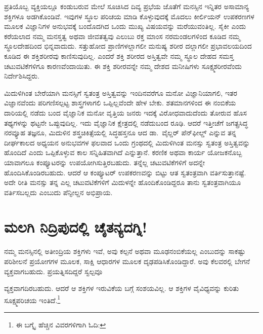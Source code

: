 \newpage

ಪ್ರತಿಯೊಬ್ಬ ವ್ಯಕ್ತಿಯಲ್ಲೂ ಕಂಡುಬರುವ ಮೇಲೆ ಸೂಚಿಸಿದ ದಿವ್ಯ ಪ್ರಭೆಯ ಜೊತೆಗೆ ಮನಸ್ಸಿನ ಇನ್ನಿತರ ಅಸಾಮಾನ್ಯ ಶಕ್ತಿಗಳೂ ಅಡಗಿಕೊಂಡಿವೆ. ಇವುಗಳ ಸ್ಥೂಲ ಪರಿಚಯ ಮಾಡಿ ಕೊಳ್ಳುವುದಕ್ಕೆ ಮೊದಲು ಕೀರ್ಲಿಯನ್ ಉಪಕರಣಗಳ ಮೂಲಕ ವಿಜ್ಞಾನಿಗಳ ಅನುಭವಕ್ಕೆ ಬಂದೊದಗಿದ ಒಂದು ಮುಖ್ಯ ವಿಷಯವನ್ನು ಮರೆಯುವಂತಿಲ್ಲ. ಸೈಕೀ ಎಂದು ಕರೆಯಲಾದ ನಮ್ಮ ಮನಸ್ತತ್ವ ಅಥವಾ ಜೀವತತ್ವವು ಎಲುಬು ರಕ್ತ ಮಾಂಸ ನರಮಂಡಲಗಳಿಂದ ಕೂಡಿದ ನಮ್ಮ ಸ್ಥೂಲದೇಹದಿಂದ ಭಿನ್ನವಾದುದು. ಸತ್ತುಹೋದ ಪ್ರಾಣಿಗಳಲ್ಲಾಗಲೀ ಮನುಷ್ಯ ಶರೀರ ದಲ್ಲಾಗಲೀ ಪ್ರಭಾವಲಯದಿಂದ ಕೂಡಿದ ಈ ಶಕ್ತಿಶರೀರವು ಕಾಣಿಸುವುದಿಲ್ಲ. ಎಂದರೆ ಶಕ್ತಿ ಶರೀರದ ಅಸ್ತಿತ್ವವೇ ನಮ್ಮ ಸ್ಥೂಲ ದೇಹದ ಸಮಸ್ತ ಚಟುವಟಿಕೆಗಳಿಗೂ ಕಾರಣವೆಂದಾಯಿತು. ಈ ಶಕ್ತಿ ಶರೀರವನ್ನೇ ನಮ್ಮ ದೇಶದ ಮನೀಷಿಗಳು ಸೂಕ್ಷ್ಮಶರೀರವೆಂದು ನಿರ್ದೇಶಿಸಿದ್ದರು.

\vskip 3pt

ಮಿದುಳಿಗಿಂತ ಬೇರೆಯಾಗಿ ಮನಸ್ಸಿಗೆ ಸ್ವತಂತ್ರ ಅಸ್ತಿತ್ವವನ್ನು ಇಂದಿನವರೆಗೂ ಮನೋ ವಿಜ್ಞಾನಿಯಾಗಲಿ, ಇತರ ವಿಜ್ಞಾನವೆಂದು ಪರಿಗಣಿಸಲ್ಪಟ್ಟ ಶಾಸ್ತ್ರಗಳಾಗಲಿ ಒಪ್ಪಿಲ್ಲವೆಂದೇ ಹೇಳ ಬೇಕು. ಶತಮಾನಗಳಿಂದ ಈ ನಂಬಿಕೆಯ ದಾರಿಯಲ್ಲಿ ನಡೆದು ಬಂದ ವೈಜ್ಞಾನಿಕ ಮನೋ ವೃತ್ತಿಯ ಜನರು ಇದಕ್ಕೆ ವಿರೋಧವಾದುದೆಂದು ತೋರುವ ಹೊಸ ತಥ್ಯಗಳನ್ನು ಥಟ್ಟನೇ ಒಪ್ಪುವುದಿಲ್ಲ. ಇದು ವೈಜ್ಞಾನಿಕ ಕ್ಷೇತ್ರದಲ್ಲಿ ನಡೆದುಬಂದ ರೂಢಿ. ಆದರೆ ಇತ್ತೀಚೆಗೆ ಜಗತ್ಪ್ರಸಿದ್ಧ ನರವ್ಯೂಹ ತಜ್ಞನೂ, ಮಿದುಳಿನ ಶಸ್ತ್ರಚಿಕಿತ್ಸೆಯಲ್ಲಿ ಸಿದ್ಧಹಸ್ತನೂ ಆದ ಡಾ.\ ವೈಲ್ಡರ್ ಪೆನ್​ಫೀಲ್ಡ್  ಎನ್ನುವ ತನ್ನ ದೀರ್ಘಕಾಲದ ಅಧ್ಯಯನ ಅನುಭವಗಳ ಫಲವಾದ ಒಂದು ಗ್ರಂಥದಲ್ಲಿ ಮಿದುಳಿಗಿಂತ ಮನಸ್ಸು ಸ್ವತಂತ್ರ ಅಸ್ತಿತ್ವವನ್ನು ಹೊಂದಿದೆ ಎಂದು ಒಪ್ಪಿಕೊಳ್ಳುವ ಕಾಲ ಸನ್ನಿಹಿತವಾಗಿದೆ ಎನ್ನುತ್ತಾನೆ. ಕರಣಿಕ ಅಥವಾ ಕಾರ್ಯ ಯೋಜಕನೊಬ್ಬ ಯಾವಾಗಲೂ ಕಂಪ್ಯೂಟರನ್ನು ಉಪಯೋಗಿಸುತ್ತಿರಬಹುದು. ತನ್ನೆಲ್ಲ ಚಟುವಟಿಕೆಗಳಿಗೆ ಅದನ್ನೇ ಹೊಂದಿಸಿಕೊಂಡಿರಬಹುದು. ಆದರೆ ಆ ಕಂಪ್ಯೂಟರ್ ಉಪಕರಣವನ್ನು ಬಿಟ್ಟು ಆತ ಸ್ವತಂತ್ರವಾಗಿ ವರ್ತಿಸುತ್ತಾನಷ್ಟೆ. ಅದೇ ರೀತಿ ಮನಸ್ಸು ತನ್ನ ಎಲ್ಲ ಚಟುವಟಿಕೆಗಳಿಗೆ ಮಿದುಳನ್ನೇ ಹೊಂದಿಕೊಂಡಿದ್ದರೂ ತಾನು ಸ್ವತಂತ್ರವಾಗಿಯೂ ವರ್ತಿಸಬಲ್ಲದು ಎಂಬುದು ಪೆನ್ಫೀಲ್ಡನ ಅಭಿಪ್ರಾಯ.


\section*{ಮಲಗಿ ನಿದ್ರಿಪುದಲ್ಲಿ ಚೈತನ್ಯದಗ್ನಿ!}


{\noindent ನಮ್ಮ ಮನಸ್ಸಿನಲ್ಲಿ ಅತೀಂದ್ರಿಯ ಶಕ್ತಿಗಳು ಇವೆ, ಅವು ಕಲ್ಪನೆ ಅಥವಾ ಮೂಢನಂಬಿಕೆಯಲ್ಲ ಎಂಬುದನ್ನು ಸಾಕಷ್ಟು ಪರಿಶೀಲನೆ ಪ್ರಯೋಗಗಳ ಮೂಲಕ, ಸಾಕ್ಷಿ ಆಧಾರಗಳ ಮೂಲಕ ದೃಢ\-ಪಡಿಸಿಕೊಂಡಿದ್ದಾರೆ. ಅವು ಕೆಲವರಲ್ಲಿ ಬೇಗನೆ ವ್ಯಕ್ತವಾಗಬಹುದು. ಪ್ರಯತ್ನಿಸದಿದ್ದರೆ ಸ್ವಲ್ಪವೂ\parfillskip=0pt\par}\newpage \noindent ವ್ಯಕ್ತವಾಗದಿರಬಹುದು. ಆದರೆ ಆ ಶಕ್ತಿಗಳ ಇರುವಿಕೆಯ ಬಗ್ಗೆ ಸಂಶಯವಿಲ್ಲ. ಆ ಶಕ್ತಿಗಳ ವೈವಿಧ್ಯವನ್ನು ಕುರಿತು ಸೂಕ್ಷ್ಮಪರಿಚಯ ಇಂತಿದೆ.\footnote{ಈ ಬಗ್ಕೆೃ ಹೆಚ್ಚಿನ ವಿವರಗಳಿಗಾಗಿ ಓದಿ: }

